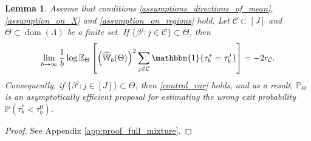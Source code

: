 \documentclass[aap,preprint]{imsart}
\newcommand{\Pro}{{\mathbb{P}}}
\newcommand{\Exp}{{\mathbb{E}}}
\theoremstyle{plain}
\newtheorem{lemma}[theorem]{Lemma}
\theoremstyle{definition}
\begin{document}

 



 \begin{lemma}\label{lemma:full_mixture_efficient}
 Assume that conditions \eqref{assumptions_directions_of_mean},  \eqref{assumption_on_X} and  \eqref{assumption_on_regions} hold.   Let $\mathcal{C} \subset [J]$
 and $\Theta \subset \operatorname{dom}(\Lambda)$ be a finite set. 
 If   $\{\beta^j : j \in \mathcal{C}\} \subset \Theta$,  then
\begin{align} \label{control_var1}
        \lim_{b\to \infty} \frac{1}{b} \log  \Exp_{\Theta}\left[ \left(\widehat{\mathbb{W}}_{b}(\Theta) \right)^2 \sum_{j \in \mathcal{C}} \mathbbm{1}\{\tau_b^* = \tau_b^j\}\right] = -2  r_{\mathcal{C}}.
\end{align}
Consequently, if $\{\beta^j: j \in [J]\} \subset \Theta$, then \eqref{control_var} holds, and as a result, $\Pro_{\Theta}$ is an asymptotically efficient proposal for estimating the wrong exit probability $\Pro(\tau_b^* < \tau_b^0)$.
 \end{lemma}
 \begin{proof}
     See Appendix \ref{app:proof_full_mixture}.
 \end{proof}
\end{document}

